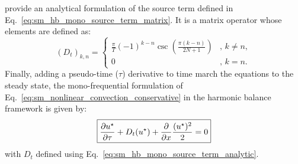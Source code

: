 \citet{Gopinath2005} provide an analytical formulation of the
source term defined in Eq.~\ref{eq:sm_hb_mono_source_term_matrix}.
It is a matrix operator whose elements are defined as:
\begin{equation}
  (D_t)_{k, n} =
  \begin{cases}
    \frac{\pi}{T}(-1)^{k-n}\csc\left(\frac{\pi
        (k-n)}{2N+1}\right) &, \, k\neq n,\\
    0 &, \, k=n.
  \end{cases}
  \label{eq:sm_hb_mono_source_term_analytic}
\end{equation}
Finally, adding a pseudo-time ($\tau$) derivative to 
time march the equations to the steady state, 
the mono-frequential formulation of 
Eq.~\ref{eq:sm_nonlinear_convection_conservative} in the harmonic
balance framework is given by:
\begin{equation}
	\fbox{$
	\displaystyle \frac{\partial u^\star}{\partial \tau} + 
	D_t (u^\star) + 
	\displaystyle \frac{\partial}{\partial x}
		\frac{(u^\star)^2}{2} = 0
	$}
\end{equation}
with $D_t$ defined using Eq.~\ref{eq:sm_hb_mono_source_term_analytic}.

